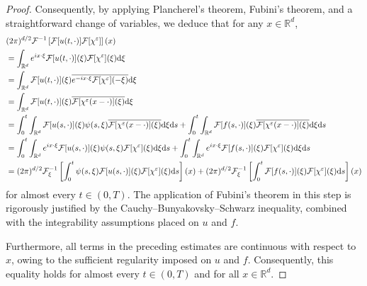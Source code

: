 \documentclass[11pt,reqno]{amsart}
\theoremstyle{definition}
\theoremstyle{remark}
\newcommand\bR{\mathbb{R}}
\newcommand\cF{\mathcal{F}}
\numberwithin{equation}{section}
\begin{document}
\begin{proof}
Consequently, by applying Plancherel's theorem, Fubini's theorem, and a straightforward change of variables, we deduce that for any $x \in \bR^d$,
\begin{align*}
&(2\pi)^{d/2}\cF^{-1}\left[ \cF[u(t,\cdot)] \cF[\chi^\varepsilon] \right](x)  \\
									\notag
&=\int_{\bR^d} e^{i  x \cdot \xi} \cF[u(t,\cdot)](\xi) \cF[\chi^\varepsilon](\xi) \mathrm{d}\xi \\
									\notag
&=\int_{\bR^d} \cF[u(t,\cdot)](\xi)  \overline{e^{-i  x \cdot \xi}\cF[\chi^\varepsilon](-\xi)} \mathrm{d}\xi \\
									\notag
&=\int_{\bR^d} \cF[u(t,\cdot)](\xi) \overline{\cF[\chi^\varepsilon(x-\cdot)](\xi)} \mathrm{d}\xi \\
									\notag
&= \int_0^t \int_{\bR^d} \cF[u(s,\cdot)](\xi) \psi(s,\xi) \overline{ \cF[\chi^\varepsilon(x-\cdot)](\xi)} \mathrm{d}\xi\mathrm{d}s 
+\int_0^t \int_{\bR^d} \cF[f(s,\cdot)](\xi) \overline{\cF[\chi^\varepsilon(x-\cdot)](\xi)} \mathrm{d}\xi \mathrm{d}s \\
									\notag
&= \int_0^t \int_{\bR^d} e^{ix \cdot \xi}\cF[u(s,\cdot)](\xi) \psi(s,\xi)  \cF[\chi^\varepsilon](\xi) \mathrm{d}\xi\mathrm{d}s 
+\int_0^t \int_{\bR^d} e^{ix \cdot \xi}\cF[f(s,\cdot)](\xi)  \cF[\chi^\varepsilon](\xi) \mathrm{d}\xi\mathrm{d}s \\
									\notag
&=(2\pi)^{d/2} \cF_{\xi}^{-1}\left[ \int_0^t \psi(s,\xi) \cF[u(s,\cdot)](\xi)  \cF[\chi^\varepsilon](\xi) \mathrm{d}s \right](x)
+(2\pi)^{d/2} \cF_{\xi}^{-1}\left[ \int_0^t\cF[f(s,\cdot)](\xi)  \cF[\chi^\varepsilon](\xi) \mathrm{d}s \right](x)
\end{align*}
for almost every $t \in (0,T)$. 
The application of Fubini's theorem in this step is rigorously justified by the Cauchy--Bunyakovsky--Schwarz inequality, combined with the integrability assumptions placed on $u$ and $f$.

Furthermore, all terms in the preceding estimates are continuous with respect to $x$, owing to the sufficient regularity imposed on $u$ and $f$.
Consequently, this equality holds for almost every $t \in (0,T)$ and for all $x \in \bR^d$.



\end{proof}
\end{document}
